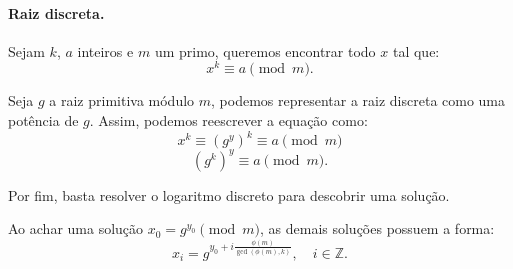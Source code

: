 \paragraph{Raiz discreta.} Sejam $k$, $a$ inteiros e $m$ um primo, queremos encontrar todo $x$ tal que:
$$x^k \equiv a \pmod{m}.$$

Seja $g$ a raiz primitiva módulo $m$, podemos representar a raiz discreta como uma potência de $g$. Assim, podemos reescrever a equação como:
$$x^k \equiv (g^y)^k \equiv a \pmod{m}$$
$$(g^k)^y \equiv a \pmod{m}.$$

Por fim, basta resolver o logaritmo discreto para descobrir uma solução.

Ao achar uma solução $x_0 = g^{y_0} \pmod{m}$, as demais soluções possuem a forma:
$$x_i = g^{y_0+i\frac{\phi(m)}{\gcd(\phi(m),k)}}, \quad i \in \mathbb{Z}.$$